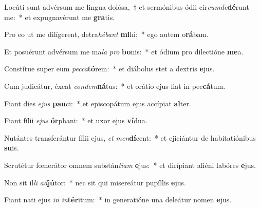 \item Locúti sunt advérsum me lingua dolósa,~† et sermónibus ódii cir\textit{cum}\textit{de}\textbf{dé}runt me:~* et expugnavérunt me \textbf{gra}tis.
\item Pro eo ut me dilígerent, detra\textit{hé}\textit{bant} \textbf{mi}hi:~* ego autem o\textbf{rá}bam.
\item Et posuérunt advérsum me ma\textit{la} \textit{pro} \textbf{bo}nis:~* et ódium pro dilectióne \textbf{me}a.
\item Constítue super eum \textit{pec}\textit{ca}\textbf{tó}rem:~* et diábolus stet a dextris \textbf{e}jus.
\item Cum judicátur, éxeat \textit{con}\textit{dem}\textbf{ná}tus:~* et orátio ejus fiat in pec\textbf{cá}tum.
\item Fiant dies \textit{e}\textit{jus} \textbf{pau}ci:~* et episcopátum ejus accípiat \textbf{al}ter.
\item Fiant fílii \textit{e}\textit{jus} \textbf{ór}phani:~* et uxor ejus \textbf{ví}dua.
\item Nutántes transferántur fílii ejus, \textit{et} \textit{men}\textbf{dí}cent:~* et ejiciántur de habitatiónibus \textbf{su}is.
\item Scrutétur fœnerátor omnem substán\textit{ti}\textit{am} \textbf{e}jus:~* et dirípiant aliéni labóres \textbf{e}jus.
\item Non sit il\textit{li} \textit{ad}\textbf{jú}tor:~* nec sit qui misereátur pupíllis \textbf{e}jus.
\item Fiant nati ejus \textit{in} \textit{in}\textbf{tér}itum:~* in generatióne una deleátur nomen \textbf{e}jus.
